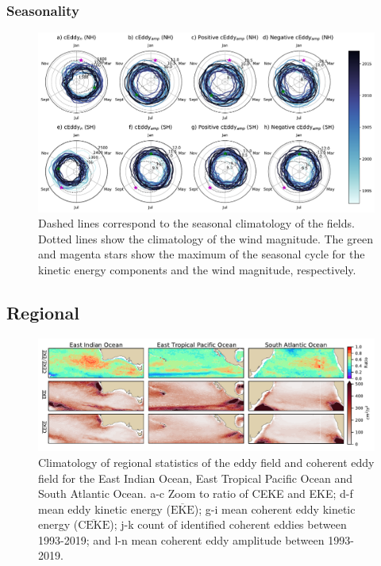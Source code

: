 \documentclass[draft]{agujournal2019}
\newcommand{\MEKE}{\overline{\textrm{EKE}}}
\newcommand{\MCEKE}{\overline{\textrm{CEKE}}}
\begin{document}
	\subsubsection{Seasonality}

	\begin{figure}
	    \centering
	    \includegraphics[width=1\textwidth]{figures/All_polar_plots_eddy_stats_polarity.pdf}
	    \caption{Dashed lines correspond to the seasonal climatology of the fields. Dotted lines show the climatology of the wind magnitude. The green and magenta stars show the maximum of the seasonal cycle for the kinetic energy components and the wind magnitude, respectively. }
	    \label{fig:my_label}
	\end{figure}


	\subsection{Regional}
	
	\begin{figure}
	    \centering
	    \includegraphics[width=1\textwidth]{figures/regional_eke_ceke_stats_no_stats.pdf}
	    \caption{Climatology of regional statistics of the eddy field and coherent eddy field for the East Indian Ocean, East Tropical Pacific Ocean and South Atlantic Ocean. a-c Zoom to ratio of CEKE and EKE; d-f  mean eddy kinetic energy ($\MEKE$); g-i mean coherent eddy kinetic energy ($\MCEKE$); j-k count of identified coherent eddies between 1993-2019; and l-n mean coherent eddy amplitude between 1993-2019.}
	    \label{fig:my_label}
	\end{figure}
\end{document}
